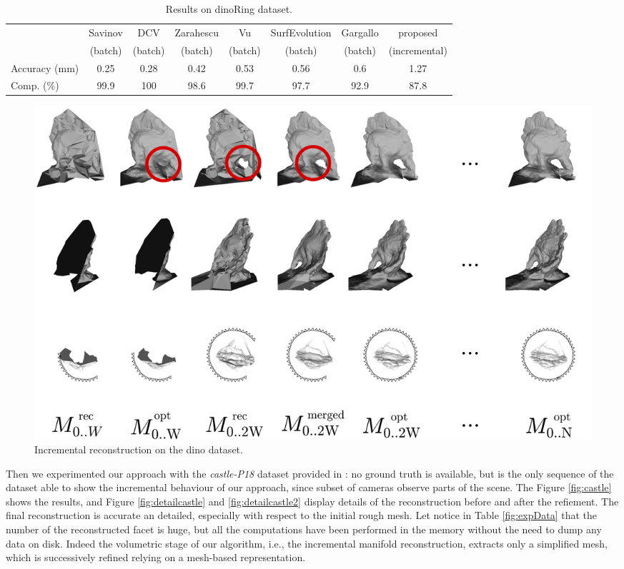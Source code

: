 \begin{table}[t]
\scriptsize
\centering
  \caption{Results on dinoRing dataset.}
  \label{tab:dinoRes}
\begin{tabular}{lccccccc}
\hline
&Savinov\cite{savinov2016semantic}&DCV\cite{li2015detail}&Zarahescu\cite{zaharescu2007transformesh}&Vu\cite{hiep2009towards}&SurfEvolution&Gargallo\cite{gargallo2007minimizing}&proposed\\
&(batch)&(batch)&(batch)&(batch)&(batch)&(batch)&(incremental)\\
Accuracy (mm) &0.25&0.28&0.42&0.53&0.56&0.6&1.27\\
Comp. (\%)&99.9&100&98.6&99.7&97.7&92.9&87.8
\end{tabular}
\end{table}



 \begin{figure}[t]
  \centering
  \includegraphics[width=\textwidth]{./img/ch-incr-dens/dino}
  \caption{Incremental reconstruction on the dino dataset.}
  \label{fig:dinoIncr}
\end{figure}


Then we experimented our approach with the \emph{castle-P18} dataset provided in \cite{strecha2008}: no ground truth is available, but is the only sequence of the dataset able to show the incremental behaviour of our approach, since subset of cameras observe parts of the scene. 
The Figure \ref{fig:castle} shows the results, and Figure \ref{fig:detailcastle} and \ref{fig:detailcastle2} display details of the reconstruction before and after the refiement. The final reconstruction is accurate  an detailed, especially with respect to the initial rough mesh.
Let notice in Table \ref{fig:expData} that the number of the reconstructed facet is huge, but all the computations have been performed in the memory without the need to dump any data on disk. Indeed the volumetric stage of our algorithm, i.e., the incremental manifold reconstruction, extracts only a  simplified mesh, which is successively refined relying on a mesh-based representation.



